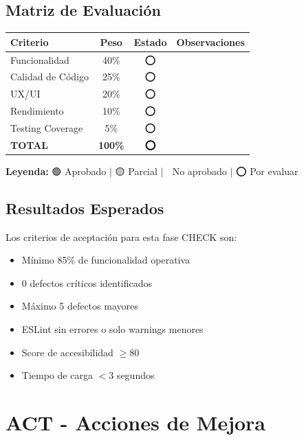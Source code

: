 \documentclass[12pt,a4paper]{report}
\begin{document}
\section{Matriz de Evaluación}

\begin{table}[h]
    \centering
    \begin{tabular}{|l|c|c|p{6cm}|}
        \hline
        \rowcolor{grisClaro}
        \textbf{Criterio} & \textbf{Peso} & \textbf{Estado} & \textbf{Observaciones} \\
        \hline
        Funcionalidad & 40\% & ⭕ & \\
        \hline
        Calidad de Código & 25\% & ⭕ & \\
        \hline
        UX/UI & 20\% & ⭕ & \\
        \hline
        Rendimiento & 10\% & ⭕ & \\
        \hline
        Testing Coverage & 5\% & ⭕ & \\
        \hline
        \rowcolor{grisClaro}
        \textbf{TOTAL} & \textbf{100\%} & \textbf{⭕} & \\
        \hline
    \end{tabular}
\end{table}

\textbf{Leyenda:} 🟢 Aprobado $|$ 🟡 Parcial $|$ 🔴 No aprobado $|$ ⭕ Por evaluar

\section{Resultados Esperados}

Los criterios de aceptación para esta fase CHECK son:

\begin{itemize}
    \item Mínimo 85\% de funcionalidad operativa
    \item 0 defectos críticos identificados
    \item Máximo 5 defectos mayores
    \item ESLint sin errores o solo warnings menores
    \item Score de accesibilidad $\geq 80$
    \item Tiempo de carga $< 3$ segundos
\end{itemize}

\chapter{ACT - Acciones de Mejora}
\end{document}
